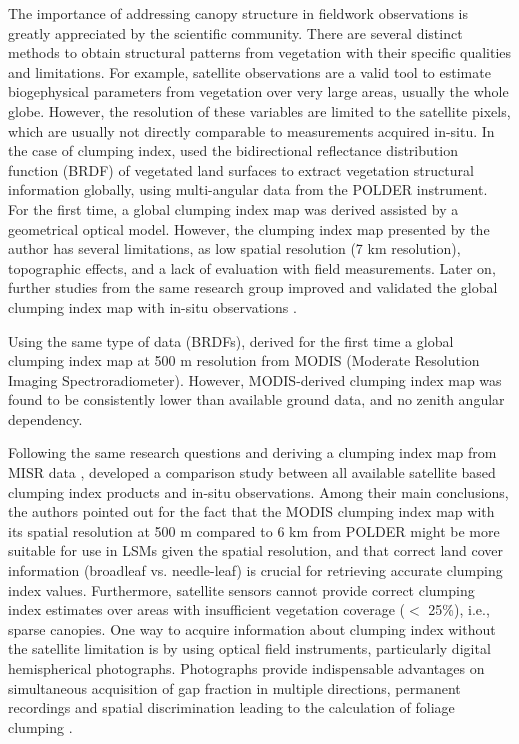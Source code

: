 The importance of addressing canopy structure in fieldwork observations is greatly appreciated by the scientific community. There are several distinct methods to obtain structural patterns from vegetation with their specific qualities and limitations. For example, satellite observations are a valid tool to estimate biogephysical parameters from vegetation over very large areas, usually the whole globe. However, the resolution of these variables are limited to the satellite pixels, which are usually not directly comparable to measurements acquired in-situ. 
In the case of clumping index, \citep{Chen2005} used the bidirectional reflectance distribution function (BRDF) of vegetated land surfaces to extract vegetation structural information globally, using multi-angular data from the POLDER instrument. For the first time, a global clumping index map was derived assisted by a geometrical optical model. However, the clumping index map presented by the author has several limitations, as low spatial resolution (7 km resolution), topographic effects, and a lack of evaluation with field measurements. Later on, further studies from the same research group improved and validated the global clumping index map with in-situ observations \citep{Pisek2010}.

Using the same type of data (BRDFs), \citet{He2012} derived for the first time a global clumping index map at 500 m resolution from MODIS (Moderate Resolution Imaging Spectroradiometer). However, MODIS-derived clumping index map was found to be consistently lower than available ground data, and no zenith angular dependency.

Following the same research questions and deriving a clumping index map from MISR data \citep{Pisek2013}, \citet{Pisek2015} developed a comparison study between all available satellite based clumping index products and in-situ observations. Among their main conclusions, the authors pointed out for the fact that the MODIS clumping index map \citep{He2012} with its spatial resolution at 500 m compared to 6 km from POLDER might be more suitable for use in LSMs given the spatial resolution, and that correct land cover information (broadleaf vs. needle-leaf) is crucial for retrieving accurate clumping index values. Furthermore, satellite sensors cannot provide correct clumping index estimates over areas with insufficient vegetation coverage ($<$ 25\%), i.e., sparse canopies.
One way to acquire information about clumping index without the satellite limitation is by using optical field instruments, particularly digital hemispherical photographs. Photographs provide indispensable advantages on simultaneous acquisition of gap fraction in multiple directions, permanent recordings and spatial discrimination leading to the calculation of foliage clumping \citep{Gonsamo2009}. 

